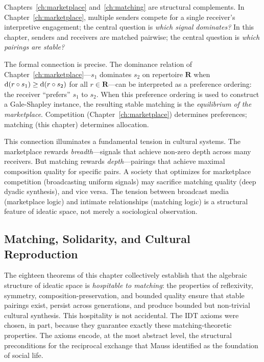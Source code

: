 \begin{remark}
Chapters~\ref{ch:marketplace} and~\ref{ch:matching} are structural
complements.  In Chapter~\ref{ch:marketplace}, multiple senders compete
for a single receiver's interpretive engagement; the central question is
\emph{which signal dominates?}  In this chapter, senders and receivers are
matched pairwise; the central question is \emph{which pairings are stable?}

The formal connection is precise.  The dominance relation of
Chapter~\ref{ch:marketplace}---$s_1$ dominates $s_2$ on repertoire
$\mathbf{R}$ when
$\operatorname{d}(r \circ s_1) \ge \operatorname{d}(r \circ s_2)$ for all
$r \in \mathbf{R}$---can be interpreted as a preference ordering: the
receiver ``prefers'' $s_1$ to $s_2$.  When this preference ordering is
used to construct a Gale-Shapley instance, the resulting stable matching
is the \emph{equilibrium of the marketplace}.  Competition
(Chapter~\ref{ch:marketplace}) determines preferences; matching
(this chapter) determines allocation.

This connection illuminates a fundamental tension in cultural systems.  The
marketplace rewards \emph{breadth}---signals that achieve non-zero depth
across many receivers.  But matching rewards \emph{depth}---pairings that
achieve maximal composition quality for specific pairs.  A society that
optimizes for marketplace competition (broadcasting uniform signals) may
sacrifice matching quality (deep dyadic synthesis), and vice versa.  The
tension between broadcast media (marketplace logic) and intimate
relationships (matching logic) is a structural feature of ideatic space,
not merely a sociological observation.
\end{remark}

\subsection{Matching, Solidarity, and Cultural Reproduction}

The eighteen theorems of this chapter collectively establish that the
algebraic structure of ideatic space is \emph{hospitable to matching}: the
properties of reflexivity, symmetry, composition-preservation, and bounded
quality ensure that stable pairings exist, persist across generations, and
produce bounded but non-trivial cultural synthesis.  This hospitality is
not accidental.  The IDT axioms were chosen, in part, because they
guarantee exactly these matching-theoretic properties.  The axioms encode,
at the most abstract level, the structural preconditions for the
reciprocal exchange that Mauss identified as the foundation of social life.

